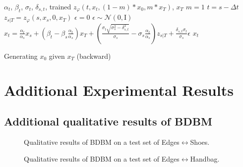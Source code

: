 \begin{algorithm}
\begin{algorithmic}[1] 
 $\alpha_t$, $\beta_t$, $\sigma_t$, $\delta_{s,t}$, trained $z_{\varphi}\left(t,x_{t},\left(1-m\right)*x_{0},m*x_{T}\right)$, $x_T$
\State $m=1$
	\State $t = s - \Delta t$
	\State $z_{s|T} = z_{\varphi}\left(s,x_{s},0,x_{T}\right)$
		\State $\epsilon = 0$
    \Else
        \State $\epsilon \sim \mathcal{N}(0, \mathrm{I})$
    \EndIf
    \State $x_{t} = \frac{\alpha_{t}}{\alpha_{s}}x_{s}+\left(\beta_{t}-\beta_{s}\frac{\alpha_{t}}{\alpha_{s}}\right)x_{T}+\left(\frac{\sigma_{t}\sqrt{\sigma_{s}^{2}-\delta_{s,t}^{2}}}{\sigma_{s}}-\sigma_{s}\frac{\alpha_{t}}{\alpha_{s}}\right) z_{s|T} + \frac{\delta_{s,t}\sigma_{t}}{\sigma_{s}}\epsilon$
\EndFor
\State 
\Return $x_{t}$ 
\end{algorithmic}

\caption{Generating $x_{0}$ given $x_{T}$ (backward)\label{alg:Sampling-backward}}
\end{algorithm}


\section{Additional Experimental Results}

\subsection{Additional qualitative results of BDBM\label{subsec:Additional-qualitative-results}}

\noindent 
\begin{figure}
\begin{centering}
{}
\par\end{centering}
\caption{Qualitative results of BDBM on a test set of Edges$\leftrightarrow$Shoes.\label{fig:Additional-results-EdgesShoes}}
\end{figure}

\noindent 
\begin{figure}
\begin{centering}
{}
\par\end{centering}
\caption{Qualitative results of BDBM on a test set of Edges$\leftrightarrow$Handbag.\label{fig:Additional-results-EdgesHandbags}}
\end{figure}

